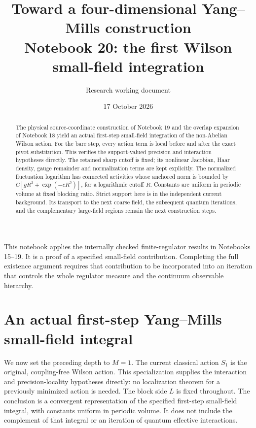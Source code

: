 \documentclass[11pt]{article}
\title{Toward a four-dimensional Yang--Mills construction\\
\large Notebook 20: the first Wilson small-field integration}
\author{Research working document}
\date{17 October 2026}
\theoremstyle{remark}
\begin{document}
\maketitle
\begin{abstract}
The physical source-coordinate construction of Notebook 19 and
the overlap expansion of Notebook 18 yield an actual first-step
small-field integration of the non-Abelian Wilson action.
For the bare step, every action term is local before and after
the exact pivot substitution. This verifies the support-valued
precision and interaction hypotheses directly. The retained
sharp cutoff is fixed; its nonlinear Jacobian, Haar density,
gauge remainder and normalization terms are kept explicitly.
The normalized fluctuation logarithm has connected activities
whose anchored norm is bounded by
$C[gR^3+\exp(-cR^2)]$, for a logarithmic cutoff $R$.
Constants are uniform in periodic volume at fixed blocking
ratio. Strict support here is in the independent current
background. Its transport to the next coarse field, the
subsequent quantum iterations, and the complementary
large-field regions remain the next construction steps.
\end{abstract}

This notebook applies the internally checked finite-regulator
results in Notebooks 15--19. It is a proof of a specified
small-field contribution. Completing the full existence
argument requires that contribution to be incorporated into
an iteration that controls the whole regulator measure and
the continuum observable hierarchy.


\section{An actual first-step Yang--Mills small-field integral}
\label{bs-section}

We now set the preceding depth to $M=1$. The current classical
action $S_1$ is the original, coupling-free Wilson action. This
specialization supplies the interaction and precision-locality
hypotheses directly: no localization theorem for a previously
minimized action is needed. The block side $L$ is fixed throughout.
The conclusion is a convergent representation of the specified
first-step small-field integral, with constants uniform in periodic
volume. It does not include the complement of that integral or
an iteration of quantum effective interactions.
\end{document}
